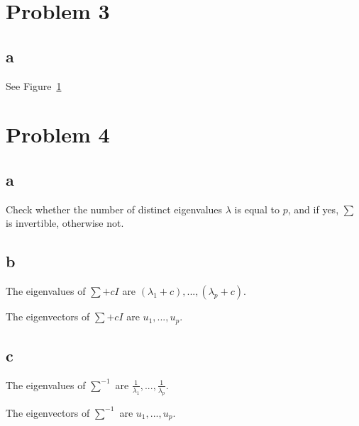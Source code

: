 \documentclass[a4paper,11pt]{article}
\theoremstyle{mytheor}
\begin{document}
\section*{Problem 3}
\subsection*{a}
See Figure~\ref{fig:3}
\begin{figure}[t]
	\label{fig:3}
\end{figure}

\section*{Problem 4}
\subsection*{a}
Check whether the number of distinct eigenvalues $\lambda$ is equal to $p$, and
if yes, $\sum$ is invertible, otherwise not.

\subsection*{b}
The eigenvalues of $\sum + c I$ are $(\lambda_1 + c), ... , (\lambda_p + c)$.

The eigenvectors of $\sum + c I$ are $u_1, ..., u_p$.

\subsection*{c}
The eigenvalues of $\sum^{-1}$ are $\frac{1}{\lambda_1}, ... , \frac{1}{\lambda_p} $.

The eigenvectors of $\sum^{-1}$ are $u_1, ..., u_p$.
\end{document}
